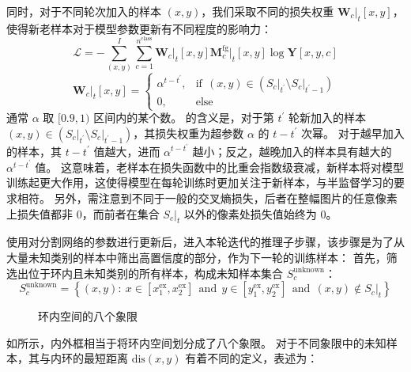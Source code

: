 同时，对于不同轮次加入的样本 $(x,y)$，我们采取不同的损失权重 $\mathbf{W}_c\vert_{t}[x,y]$，使得新老样本对于模型参数更新有不同程度的影响力：
\begin{equation}
\mathcal{L} = - \sum\limits_{(x,y)}^{I} \sum\limits_{c=1}^{n^\text{class}} \mathbf{W}_c\vert_{t}[x,y] \mathbf{M}^\text{fg}_c\vert_{t}[x,y] \log{\mathbf{Y}[x,y,c]}
\label{eqn:weighted-crossentropy}
\end{equation}
\begin{equation}
\mathbf{W}_c\vert_{t}[x,y] =
\begin{cases}
\alpha^{t - t^\prime},&\text{if}\ \ (x,y) \in (S_c\vert_{t^\prime}{\setminus}S_c\vert_{t^\prime-1})\\
0,&\text{else}
\end{cases}
\label{eqn:loss-weight}
\end{equation}
通常 $\alpha$ 取 $[0.9, 1)$ 区间内的某个数。
的含义是，对于第 $t^\prime$ 轮新加入的样本 $(x,y) \in (S_c\vert_{t^\prime}{\setminus}S_c\vert_{t^\prime-1})$，其损失权重为超参数 $\alpha$ 的 $t - t^\prime$ 次幂。
对于越早加入的样本，其 $t - t^\prime$ 值越大，进而 $\alpha^{t - t^\prime}$ 越小；反之，越晚加入的样本具有越大的 $\alpha^{t - t^\prime}$ 值。
这意味着，老样本在损失函数中的比重会指数级衰减，新样本将对模型训练起更大作用，这使得模型在每轮训练时更加关注于新样本，与半监督学习的要求相符。
另外，需注意到不同于一般的交叉熵损失，后者在整幅图片的任意像素上损失值都非 $0$，而前者在集合 $S_c\vert_{t}$ 以外的像素处损失值始终为 $0$。
\par
使用对分割网络的参数进行更新后，进入本轮迭代的推理子步骤，该步骤是为了从大量未知类别的样本中筛出高置信度的部分，作为下一轮的训练样本：
首先，筛选出位于环内且未知类别的所有样本，构成未知样本集合 $S^\text{unknown}_c$：
\begin{equation}
S^\text{unknown}_c = \left\{(x,y):\ x \in [x_1^\text{ex}, x_2^\text{ex}]\ \ \text{and}\ \ y \in [y_1^\text{ex}, y_2^\text{ex}]\ \ \text{and}\ \ (x,y) \notin S_c\vert_{t}\right\}
\end{equation}
\par
\begin{figure}[h]
\centering
\caption{环内空间的八个象限}
\label{fig:8-quadrant}
\end{figure}
如所示，内外框相当于将环内空间划分成了八个象限。
对于不同象限中的未知样本，其与内环的最短距离 $\text{dis}(x,y)$ 有着不同的定义，表述为：
